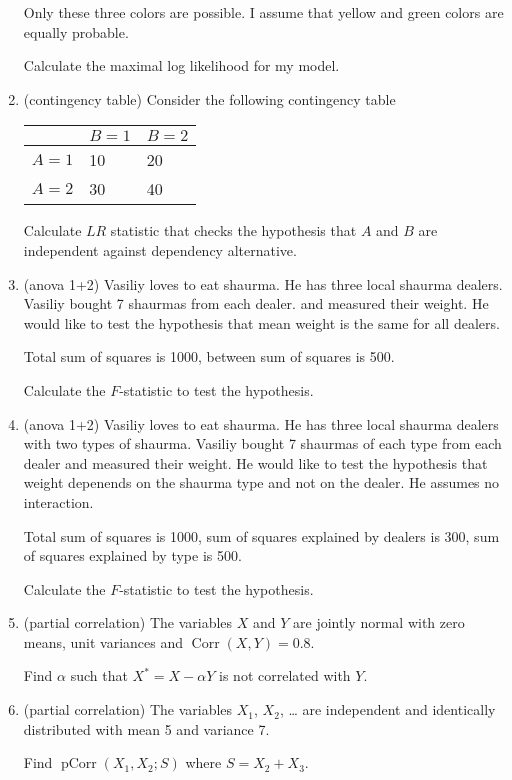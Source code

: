 \documentclass[12pt]{article}
\DeclareMathOperator{\Corr}{Corr}
\DeclareMathOperator{\pCorr}{pCorr}
\begin{document}
\begin{enumerate}
    Only these three colors are possible. I assume that yellow and green colors are equally probable.  
    
    Calculate the maximal log likelihood for my model.  
    \item (contingency table) Consider the following contingency table 
    
    \begin{tabular}{@{}lll@{}}
        \toprule
         & $B=1$ & $B=2$ \\ 
         \midrule
         $A=1$ & 10 & 20 \\
         $A=2$ & 30 & 40 \\
        \bottomrule
        \end{tabular}


    Calculate $LR$ statistic that checks the hypothesis that $A$ and $B$ are independent against dependency alternative. 

    \item (anova 1+2) Vasiliy loves to eat shaurma. He has three local shaurma dealers. Vasiliy bought 7 shaurmas from each dealer. 
    and measured their weight. He would like to test the hypothesis that mean weight is the same for all dealers. 

    Total sum of squares is 1000, between sum of squares is 500. 

    Calculate the $F$-statistic to test the hypothesis.
    
    \item (anova 1+2) Vasiliy loves to eat shaurma. He has three local shaurma dealers with two types of shaurma.  
    Vasiliy bought 7 shaurmas of each type from each dealer 
    and measured their weight. He would like to test the hypothesis that weight depenends on the shaurma type and not on the dealer.
    He assumes no interaction.  

    Total sum of squares is 1000, sum of squares explained by dealers is 300, sum of squares explained by type is 500. 

    Calculate the $F$-statistic to test the hypothesis.

    \item (partial correlation) The variables $X$ and $Y$ are jointly normal with zero means,
unit variances and $\Corr(X, Y) = 0.8$. 

Find $\alpha$ such that $X^* = X - \alpha Y$ is not correlated with $Y$. 

\item (partial correlation) The variables $X_1$, $X_2$, \ldots{ } are independent and identically distributed with mean 5 and variance 7. 

Find $\pCorr(X_1, X_2; S)$ where $S = X_2 + X_3$.
    
    
\end{enumerate}
\end{document}

